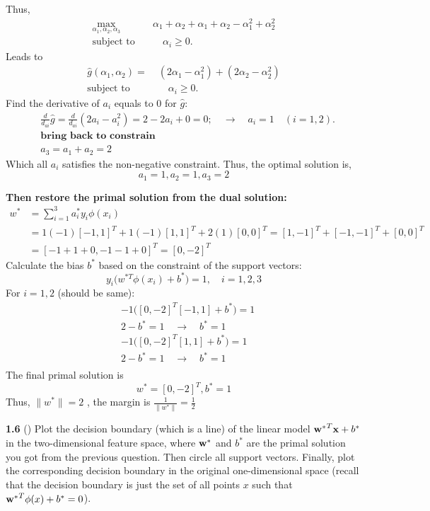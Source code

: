 Thus,
\[
\begin{aligned}
\max_{\alpha_1,\alpha_2,\alpha_3}
\quad
&\alpha_1 + \alpha_2 + \alpha_1 + \alpha_2 -\alpha_1^2 + \alpha_2^2  \\
\text{subject to} \quad
&\quad \alpha_i \ge 0.
\end{aligned}
\]
Leads to
\[
\begin{aligned}
\hat{g}(\alpha_1 , \alpha_2) = \;
&(2\alpha_1-\alpha_1^2) + (2\alpha_2 - \alpha_2^2)  \\
\text{subject to} \quad
&\quad \alpha_i \ge 0.
\end{aligned}
\]
Find the derivative of $a_i$ equals to 0 for $\hat{g}$:
\[
\begin{aligned}
&\frac{d}{d_{ai}} \hat{g} =  \frac{d}{d_{ai}}(2a_i - a_i^2) = 2-2a_i +0 = 0;  \quad \longrightarrow \quad
a_i =1  \quad (i = 1, 2). \\
&\textbf{bring back to constrain} \\
&a_3 = a_1 + a_2 = 2
\end{aligned}
\]
Which all $a_i$ satisfies the non-negative constraint. Thus, the optimal solution is,
\[
a_1 = 1, a_2 = 1, a_3 = 2
\]

\textbf{Then restore the primal solution from the dual solution:}
\begin{align*}
w^{*} &= \sum_{i=1}^{3}  a_i^{*} y_i \phi(x_i) \\
&= 1(-1)[-1,1]^T + 1(-1)[1,1]^T + 2 (1) [0,0]^T = [1,-1]^T + [-1,-1]^T + [0,0]^T \\
&=  [-1+1+0,-1-1+0]^T = [0,-2]^T
\end{align*}
Calculate the bias $b^{*}$ based on the constraint of the support vectors:
\[
y_i \big(w^{*T} \phi(x_i) + b^{*}\big) = 1, 
\quad i = 1,2,3
\]
For $i = 1,2$ (should be same):
\begin{align*}
& -1 \big([0,-2]^T [-1,1] + b^{*}\big) = 1 \\
& 2 - b^{*} = 1 \quad \rightarrow \quad b^{*} = 1  \\
& -1 \big([0,-2]^T [1,1] + b^{*}\big) = 1 \\
& 2 - b^{*} = 1 \quad \rightarrow \quad b^{*} = 1  \\
\end{align*}
The final primal solution is
\[
w^{*} = [0,-2]^T ,  b^{*} = 1 
\]
Thus, $\|w^{*}\| = 2$ , the margin is $\frac{1}{\|w^{*}\|} = \frac{1}{2}$

\bigskip

\textbf{1.6} () Plot the decision boundary (which is a line) of the linear model ${\mathbf{w}^*}^T \mathbf{x} + b^*$ in the two-dimensional feature space, where $\mathbf{w}^*$ and $b^*$ are the primal solution you got from the previous question. Then circle all support vectors. Finally, plot the corresponding decision boundary in the original one-dimensional space (recall that the decision boundary is just the set of all points $x$ such that ${\mathbf{w}^*}^T \mathbf{\phi}(x) + b^* = 0$).\\

